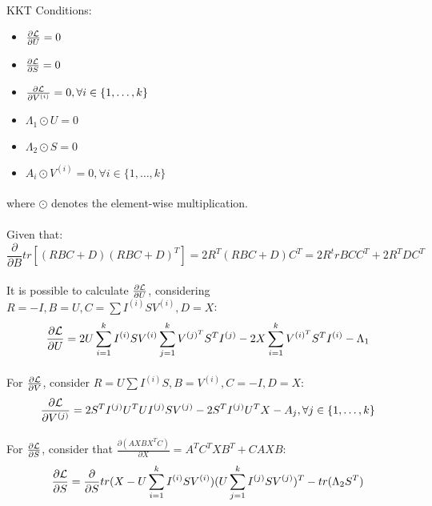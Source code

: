 \documentclass[paper=a4, fontsize=11pt]{scrartcl} %
\numberwithin{equation}{section} %
\numberwithin{figure}{section} %
\numberwithin{table}{section} %
\begin{document}
\paragraph{}
KKT Conditions:
\begin{itemize}
\item $\frac{\partial {\cal L}}{\partial U} = 0$
\item $\frac{\partial {\cal L}}{\partial S} = 0$
\item $\frac{\partial {\cal L}}{\partial V^{(i)}} = 0, \forall i \in \{1, \dots, k\}$
\item $\Lambda_1 \odot U = 0$
\item $\Lambda_2 \odot S = 0$
\item $A_i \odot V^{(i)} = 0, \forall i \in \{1, \dots, k\}$
\end{itemize}
\paragraph{}
where $\odot$ denotes the element-wise multiplication.

\paragraph{}
Given that:
$$\frac{\partial}{\partial B} tr \left[ (RBC + D)(RBC + D)^T \right] = 2R^T(RBC + D)C^T = 2R^trBCC^T + 2R^TDC^T$$

\paragraph{}
It is possible to calculate $\frac{\partial {\cal L}}{\partial U}$, considering $R = -I, B = U, C = \sum I^{(i)}SV^{(i)}, D = X$:
$$\frac{\partial {\cal L}}{\partial U} = 2 U \sum_{i=1}^k I^{(i)} S V^{(i)} \sum_{j=1}^k V^{(j)^T} S^T I^{(j)} - 2 X \sum_{i=1}^k V^{(i)^T} S^T I^{(i)} - \Lambda_1$$

\paragraph{}
For $\frac{\partial {\cal L}}{\partial V}$, consider $R = U \sum I^{(i)} S, B = V^{(i)}, C = -I, D = X$:
$$\frac{\partial {\cal L}}{\partial V^{(j)}} = 2 S^T I^{(j)} U^T U I^{(j)} S V^{(j)} - 2 S^T I^{(j)}  U^T X - A_j, \forall j \in \{1, \dots, k\}$$

\paragraph{}
For $\frac{\partial {\cal L}}{\partial S}$, consider that $\frac{\partial (A X B X^T C)}{\partial X} = A^T C^T X B^T + C A X B$:
$$\frac{\partial {\cal L}}{\partial S} = \frac{\partial}{\partial S} tr (X - U \sum_{i=1}^{k} I^{(i)} S V^{(i)}) (U \sum_{j=1}^{k} I^{(j)} S V^{(j)})^T   - tr(\Lambda_2 S^T)$$
\end{document}
